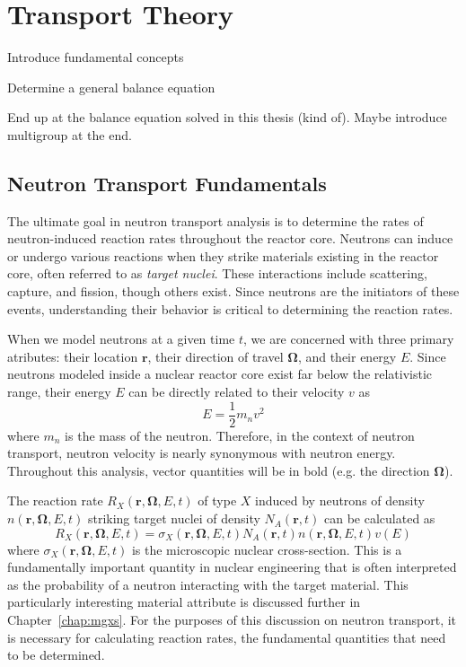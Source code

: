 \chapter{Transport Theory}
\label{chap:transport}

Introduce fundamental concepts

Determine a general balance equation

End up at the balance equation solved in this thesis (kind of). Maybe introduce multigroup at the end.

\section{Neutron Transport Fundamentals}
\label{sec:transport-fundamentals}

The ultimate goal in neutron transport analysis is to determine the rates of neutron-induced reaction rates throughout the reactor core. Neutrons can induce or undergo various reactions when they strike materials existing in the reactor core, often referred to as \textit{target nuclei}. These interactions include scattering, capture, and fission, though others exist. Since neutrons are the initiators of these events, understanding their behavior is critical to determining the reaction rates.

When we model neutrons at a given time $t$, we are concerned with three primary atributes: their location $\mathbf{r}$, their direction of travel $\mathbf{\Omega}$, and their energy $E$. Since neutrons modeled inside a nuclear reactor core exist far below the relativistic range, their energy $E$ can be directly related to their velocity $v$ as
\begin{equation}
E = \frac{1}{2} m_n v^2
\end{equation}
where $m_n$ is the mass of the neutron. Therefore, in the context of neutron transport, neutron velocity is nearly synonymous with neutron energy. Throughout this analysis, vector quantities will be in bold (e.g. the direction $\mathbf{\Omega}$).

The reaction rate $R_X(\mathbf{r}, \mathbf{\Omega}, E, t)$ of type $X$ induced by neutrons of density $n(\mathbf{r}, \mathbf{\Omega}, E, t)$ striking target nuclei of density $N_A(\mathbf{r}, t)$ can be calculated as
\begin{equation}
R_X(\mathbf{r}, \mathbf{\Omega}, E, t) = \sigma_X(\mathbf{r}, \mathbf{\Omega}, E, t) N_A(\mathbf{r}, t) n(\mathbf{r}, \mathbf{\Omega}, E, t) v(E) 
\label{eqn:rr_fundamental}
\end{equation}
where $\sigma_X(\mathbf{r}, \mathbf{\Omega}, E, t)$ is the microscopic nuclear cross-section. This is a fundamentally important quantity in nuclear engineering that is often interpreted as the probability of a neutron interacting with the target material. This particularly interesting material attribute is discussed further in Chapter~\ref{chap:mgxs}. For the purposes of this discussion on neutron transport, it is necessary for calculating reaction rates, the fundamental quantities that need to be determined.

